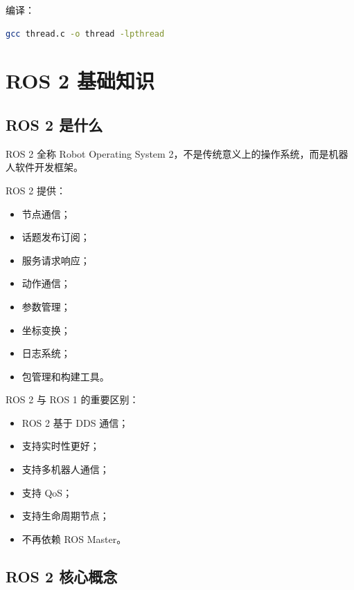 \documentclass[UTF8,a4paper,12pt]{ctexart}
\begin{document}
编译：

\begin{lstlisting}[language=bash]
gcc thread.c -o thread -lpthread
\end{lstlisting}

\section{ROS 2 基础知识}

\subsection{ROS 2 是什么}

ROS 2 全称 Robot Operating System 2，不是传统意义上的操作系统，而是机器人软件开发框架。

ROS 2 提供：
\begin{itemize}
    \item 节点通信；
    \item 话题发布订阅；
    \item 服务请求响应；
    \item 动作通信；
    \item 参数管理；
    \item 坐标变换；
    \item 日志系统；
    \item 包管理和构建工具。
\end{itemize}

ROS 2 与 ROS 1 的重要区别：
\begin{itemize}
    \item ROS 2 基于 DDS 通信；
    \item 支持实时性更好；
    \item 支持多机器人通信；
    \item 支持 QoS；
    \item 支持生命周期节点；
    \item 不再依赖 ROS Master。
\end{itemize}

\subsection{ROS 2 核心概念}
\end{document}
